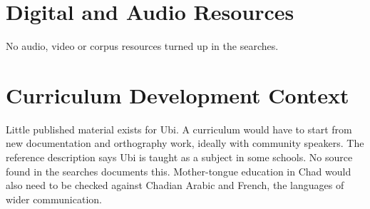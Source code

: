 \documentclass[12pt]{article}
\begin{document}
\section{Digital and Audio Resources}
No audio, video or corpus resources turned up in the searches.

\section{Curriculum Development Context}
Little published material exists for Ubi. A curriculum would have to start from new documentation and orthography work, ideally with community speakers. The reference description says Ubi is taught as a subject in some schools. No source found in the searches documents this. Mother-tongue education in Chad would also need to be checked against Chadian Arabic and French, the languages of wider communication.
\end{document}

